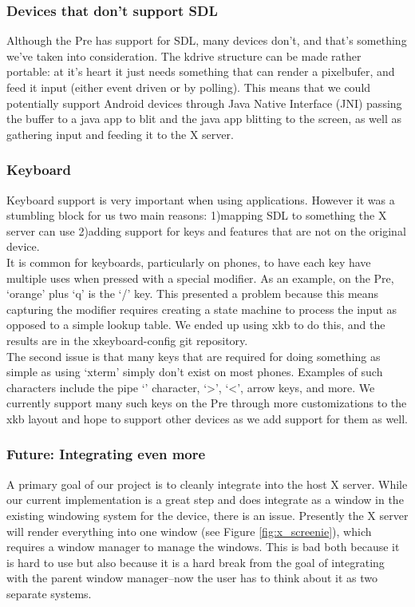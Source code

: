 \subsubsection{Devices that don't support SDL}
Although the Pre has support for SDL, many devices don't, and that's something we've taken into consideration.  The kdrive structure can be made rather portable: at it's heart it just needs something that can render a pixelbufer, and feed it input (either event driven or by polling).  This means that we could potentially support Android devices through Java Native Interface (JNI) \cite{jni} passing the buffer to a java app to blit and the java app blitting to the screen, as well as gathering input and feeding it to the X server.
\subsubsection{Keyboard}
Keyboard support is very important when using applications.  However it was a stumbling block for us two main reasons: 1)mapping SDL to something the X server can use 2)adding support for keys and features that are not on the original device.\\

It is common for keyboards, particularly on phones, to have each key have multiple uses when pressed with a special modifier.  As an example, on the Pre, `orange' plus `q' is the `/' key.  This presented a problem because this means capturing the modifier requires creating a state machine to process the input as opposed to a simple lookup table.  We ended up using xkb to do this, and the results are in the xkeyboard-config git repository. \\

The second issue is that many keys that are required for doing something as simple as using `xterm' simply don't exist on most phones.  Examples of such characters include the pipe `\textbar' character, `\textgreater', `\textless', arrow keys, and more.  We currently support many such keys on the Pre through more customizations to the xkb layout and hope to support other devices as we add support for them as well.
\subsubsection{Future: Integrating even more}
A primary goal of our project is to cleanly integrate into the host X server.  While our current implementation is a great step and does integrate as a window in the existing windowing system for the device, there is an issue.  Presently the X server will render everything into one window (see Figure \ref{fig:x_screenie}), which requires a window manager to manage the windows.  This is bad both because it is hard to use but also because it is a hard break from the goal of integrating with the parent window manager--now the user has to think about it as two separate systems.\\

